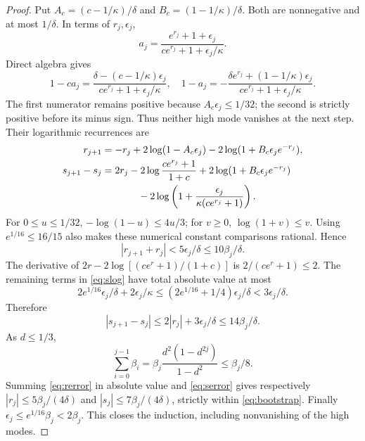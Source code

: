 \documentclass[11pt,a4paper]{article}
\theoremstyle{remark}
\begin{document}
\begin{proof}
Put $A_c=(c-1/\kappa)/\delta$ and $B_c=(1-1/\kappa)/\delta$. Both are nonnegative and at most $1/\delta$. In terms of $r_j,\epsilon_j$,
\begin{equation}\label{eq:eta}
 a_j=\frac{e^{r_j}+1+\epsilon_j}{ce^{r_j}+1+\epsilon_j/\kappa}.
\end{equation}
Direct algebra gives
\[
 1-ca_j=\frac{\delta-(c-1/\kappa)\epsilon_j}
 {ce^{r_j}+1+\epsilon_j/\kappa},\quad
 1-a_j=-\frac{\delta e^{r_j}+(1-1/\kappa)\epsilon_j}
 {ce^{r_j}+1+\epsilon_j/\kappa}.
\]
The first numerator remains positive because $A_c\epsilon_j\le1/32$; the second is strictly positive before its minus sign. Thus neither high mode vanishes at the next step. Their logarithmic recurrences are
\begin{align}
 r_{j+1}&=-r_j+2\log(1-A_c\epsilon_j)
 -2\log(1+B_c\epsilon_je^{-r_j}),\label{eq:rlog}\\
 s_{j+1}-s_j&=2r_j-2\log\frac{ce^{r_j}+1}{1+c}
 +2\log(1+B_c\epsilon_je^{-r_j})\notag\\
 &\hspace{13mm}-2\log\left(1+\frac{\epsilon_j}{\kappa(ce^{r_j}+1)}\right).
 \label{eq:slog}
\end{align}
For $0\le u\le1/32$, $-\log(1-u)\le4u/3$; for $v\ge0$, $\log(1+v)\le v$. Using $e^{1/16}\le16/15$ also makes these numerical constant comparisons rational. Hence
\begin{equation}\label{eq:rerror}
 |r_{j+1}+r_j|<5\epsilon_j/\delta\le10\beta_j/\delta.
\end{equation}
The derivative of $2r-2\log[(ce^r+1)/(1+c)]$ is $2/(ce^r+1)\le2$. The remaining terms in \eqref{eq:slog} have total absolute value at most
\[
 2e^{1/16}\epsilon_j/\delta+2\epsilon_j/\kappa
 \le(2e^{1/16}+1/4)\epsilon_j/\delta<3\epsilon_j/\delta.
\]
Therefore
\begin{equation}\label{eq:serror}
 |s_{j+1}-s_j|\le2|r_j|+3\epsilon_j/\delta
 \le14\beta_j/\delta.
\end{equation}
As $d\le1/3$,
\begin{equation}\label{eq:betasum}
 \sum_{i=0}^{j-1}\beta_i
 =\beta_j\frac{d^2(1-d^{2j})}{1-d^2}\le\beta_j/8.
\end{equation}
Summing \eqref{eq:rerror} in absolute value and \eqref{eq:serror} gives respectively $|r_j|\le5\beta_j/(4\delta)$ and $|s_j|\le7\beta_j/(4\delta)$, strictly within \eqref{eq:bootstrap}. Finally $\epsilon_j\le e^{1/16}\beta_j<2\beta_j$. This closes the induction, including nonvanishing of the high modes.


\end{proof}
\end{document}
